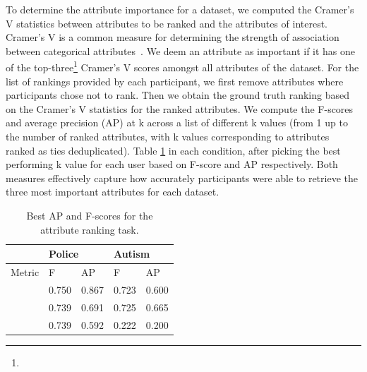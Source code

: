  To determine the attribute importance for a dataset, we computed the Cramer's V statistics between attributes to be ranked and the attributes of interest. Cramer's V is a common measure for determining the strength of association between categorical attributes~\cite{McHugh2013}. We deem an attribute as important if it has one of the top-three\footnote{} Cramer's V scores amongst all attributes of the dataset. For the list of rankings provided by each participant, we first remove attributes where participants chose not to rank. Then we obtain the ground truth ranking based on the Cramer's V statistics for the ranked attributes. We compute the F-scores and average precision (AP) at k across a list of different k values (from 1 up to the number of ranked attributes, with k values corresponding to attributes ranked as ties deduplicated). Table \ref{table:ranking_results}  in each condition, after picking the best performing k value for each user based on F-score and AP respectively. Both measures effectively capture how accurately participants were able to retrieve the three most important attributes for each dataset.
\begin{table}[ht!]
	\centering
	\begin{tabular}{|l|l|l|l|l|}
	\hline
	         & \multicolumn{2}{l|}{Police}                                   & \multicolumn{2}{l|}{Autism}                                   \\ \hline
	Metric   & F                             & AP                            & F                             & AP                            \\ \hline
	\system  & \cellcolor{blue!25}0.750 & \cellcolor{blue!25}0.867 & 0.723                         & 0.600                         \\ \hline
	\cluster & 0.739                         & 0.691                         & \cellcolor{blue!25}0.725 & \cellcolor{blue!25}0.665 \\ \hline
	\BFS     & 0.739                         & 0.592                         & 0.222                         & 0.200                         \\ \hline
	\end{tabular}
	\caption{Best AP and F-scores for the attribute ranking task.}
	\vspace{-10pt}
    \label{table:ranking_results}
\end{table}
